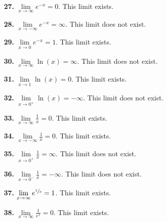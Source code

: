 \documentclass[12pt,]{book}
\theoremstyle{plain}
\theoremstyle{definition}
\numberwithin{equation}{section}
\newcommand{\fe}[2]{#1\mathopen{}\left(#2\right)\mathclose{}}
\begin{document}
                \par\smallskip
\noindent\textbf{27.}\quad{}
                    \(\lim\limits_{x\to\infty}e^{-x}=0\). This limit exists.%

                \par\smallskip
\noindent\textbf{28.}\quad{}
                    \(\lim\limits_{x\to-\infty}e^{-x}=\infty\). This limit does not exist.%

                \par\smallskip
\noindent\textbf{29.}\quad{}
                    \(\lim\limits_{x\to0}e^{-x}=1\). This limit exists.%

                \par\smallskip
\noindent\textbf{30.}\quad{}
                    \(\lim\limits_{x\to\infty}\fe{\ln}{x}=\infty\). This limit does not exist.%

                \par\smallskip
\noindent\textbf{31.}\quad{}
                    \(\lim\limits_{x\to1}\fe{\ln}{x}=0\). This limit exists.%

                \par\smallskip
\noindent\textbf{32.}\quad{}
                    \(\lim\limits_{x\to0^{+}}\fe{\ln}{x}=-\infty\). This limit does not exist.%

                \par\smallskip
\noindent\textbf{33.}\quad{}
                    \(\lim\limits_{x\to\infty}\frac{1}{x}=0\). This limit exists.%

                \par\smallskip
\noindent\textbf{34.}\quad{}
                    \(\lim\limits_{x\to-\infty}\frac{1}{x}=0\). This limit exists.%

                \par\smallskip
\noindent\textbf{35.}\quad{}
                    \(\lim\limits_{x\to0^{+}}\frac{1}{x}=\infty\). This limit does not exist.%

                \par\smallskip
\noindent\textbf{36.}\quad{}
                    \(\lim\limits_{x\to0^{-}}\frac{1}{x}=-\infty\). This limit does not exist.%

                \par\smallskip
\noindent\textbf{37.}\quad{}
                    \(\lim\limits_{x\to\infty}e^{\sfrac{1}{x}}=1\). This limit exists.%

                \par\smallskip
\noindent\textbf{38.}\quad{}
                    \(\lim\limits_{x\to\infty}\frac{1}{e^x}=0\). This limit exists.%
\end{document}
